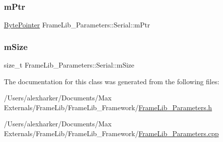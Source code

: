\mbox{\label{class_frame_lib___parameters_1_1_serial_a28ea665fc997bfdef3947079505ece1f}} 
\subsubsection{\texorpdfstring{m\+Ptr}{mPtr}}
{\footnotesize\ttfamily \hyperlink{_frame_lib___types_8h_a2c5689a997a12479b7d925e565428141}{Byte\+Pointer} Frame\+Lib\+\_\+\+Parameters\+::\+Serial\+::m\+Ptr\hspace{0.3cm}{\ttfamily [protected]}}

\mbox{\label{class_frame_lib___parameters_1_1_serial_a348d0da027db94981ccf75c939d46a98}} 
\subsubsection{\texorpdfstring{m\+Size}{mSize}}
{\footnotesize\ttfamily size\+\_\+t Frame\+Lib\+\_\+\+Parameters\+::\+Serial\+::m\+Size\hspace{0.3cm}{\ttfamily [protected]}}



The documentation for this class was generated from the following files\+:\begin{DoxyCompactItemize}
\item 
/\+Users/alexharker/\+Documents/\+Max Externals/\+Frame\+Lib/\+Frame\+Lib\+\_\+\+Framework/\hyperlink{_frame_lib___parameters_8h}{Frame\+Lib\+\_\+\+Parameters.\+h}\item 
/\+Users/alexharker/\+Documents/\+Max Externals/\+Frame\+Lib/\+Frame\+Lib\+\_\+\+Framework/\hyperlink{_frame_lib___parameters_8cpp}{Frame\+Lib\+\_\+\+Parameters.\+cpp}\end{DoxyCompactItemize}
